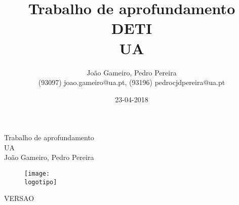 \documentclass{report}
\begin{document}
%
\def\titulo{Trabalho de aprofundamento}
\def\data{23-04-2018}
\def\autores{João Gameiro, Pedro Pereira}
\def\autorescontactos{(93097) joao.gameiro@ua.pt, (93196) pedrocjdpereira@ua.pt}
\def\versao{VERSAO}
\def\departamento{DETI}
\def\empresa{UA}
\def\logotipo{ua.pdf}
%
%
\begin{titlepage}

\begin{center}
%
\vspace*{50mm}
%
{\Huge \titulo}\\ 
%
\vspace{10mm}
%
{\Large \empresa}\\
%
\vspace{10mm}
%
{\LARGE \autores}\\ 
%
\vspace{30mm}
%
\begin{figure}[h]
\center
\texttt{[image: \\logotipo]}
\end{figure}
%
\vspace{30mm}
\end{center}
%
\begin{flushright}
\versao
\end{flushright}
\end{titlepage}

\title{%
{\Huge\textbf{\titulo}}\\
{\Large \departamento\\ \empresa}
}
%
\author{%
    \autores \\
    \autorescontactos
}
%
\date{\data}
%
\maketitle

\end{document}
